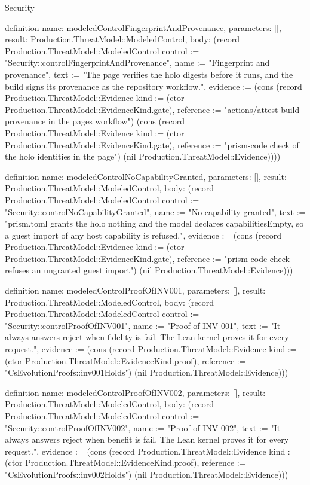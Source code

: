 \begin{lexlean}{Security}
\begin{semanticmodule}
definition{
  name: modeledControlFingerprintAndProvenance,
  parameters: [],
  result: Production.ThreatModel::ModeledControl,
  body: (record Production.ThreatModel::ModeledControl {control := "Security::controlFingerprintAndProvenance", name := "Fingerprint and provenance", text := "The page verifies the holo digests before it runs, and the build signs its provenance as the repository workflow.", evidence := (cons (record Production.ThreatModel::Evidence {kind := (ctor Production.ThreatModel::EvidenceKind.gate), reference := "actions/attest-build-provenance in the pages workflow"}) (cons (record Production.ThreatModel::Evidence {kind := (ctor Production.ThreatModel::EvidenceKind.gate), reference := "prism-code check of the holo identities in the page"}) (nil Production.ThreatModel::Evidence)))})
}

definition{
  name: modeledControlNoCapabilityGranted,
  parameters: [],
  result: Production.ThreatModel::ModeledControl,
  body: (record Production.ThreatModel::ModeledControl {control := "Security::controlNoCapabilityGranted", name := "No capability granted", text := "prism.toml grants the holo nothing and the model declares capabilitiesEmpty, so a guest import of any host capability is refused.", evidence := (cons (record Production.ThreatModel::Evidence {kind := (ctor Production.ThreatModel::EvidenceKind.gate), reference := "prism-code check refuses an ungranted guest import"}) (nil Production.ThreatModel::Evidence))})
}

definition{
  name: modeledControlProofOfINV001,
  parameters: [],
  result: Production.ThreatModel::ModeledControl,
  body: (record Production.ThreatModel::ModeledControl {control := "Security::controlProofOfINV001", name := "Proof of INV-001", text := "It always answers reject when fidelity is fail. The Lean kernel proves it for every request.", evidence := (cons (record Production.ThreatModel::Evidence {kind := (ctor Production.ThreatModel::EvidenceKind.proof), reference := "CsEvolutionProofs::inv001Holds"}) (nil Production.ThreatModel::Evidence))})
}

definition{
  name: modeledControlProofOfINV002,
  parameters: [],
  result: Production.ThreatModel::ModeledControl,
  body: (record Production.ThreatModel::ModeledControl {control := "Security::controlProofOfINV002", name := "Proof of INV-002", text := "It always answers reject when benefit is fail. The Lean kernel proves it for every request.", evidence := (cons (record Production.ThreatModel::Evidence {kind := (ctor Production.ThreatModel::EvidenceKind.proof), reference := "CsEvolutionProofs::inv002Holds"}) (nil Production.ThreatModel::Evidence))})
}


\end{semanticmodule}
\end{lexlean}
